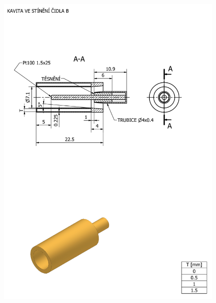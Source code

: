     \begin{figure}[ht!]
        \centering
        \includegraphics[width=\textwidth]{400_SIMULACE_KONSTRUKCNICH_UPRAV/Vykresy_rendery/Kavita_B_vykres.png}
    \end{figure}
 \label{fig:sonda-final-vykres}
